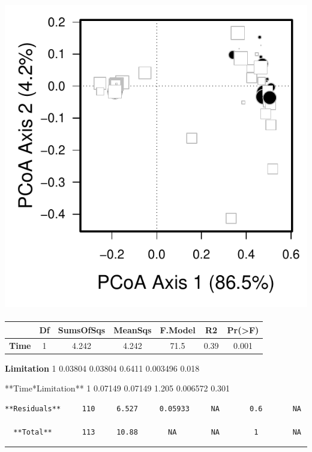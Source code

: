 \documentclass[]{article}
\begin{document}
\subsection{\texorpdfstring{\protect\includegraphics{analysis_ecoevostoich_files/figure-latex/unnamed-chunk-32-1.pdf}}{}}\label{section}

\begin{longtable}[]{@{}ccccccc@{}}
\toprule
~ & Df & SumsOfSqs & MeanSqs & F.Model & R2 &
Pr(\textgreater{}F)\tabularnewline
\midrule
\endhead
\textbf{Time} & 1 & 4.242 & 4.242 & 71.5 & 0.39 & 0.001\tabularnewline
\bottomrule
\end{longtable}

\textbf{Limitation} 1 0.03804 0.03804 0.6411 0.003496 0.018

**Time*Limitation** 1 0.07149 0.07149 1.205 0.006572 0.301

\begin{verbatim}
**Residuals**     110     6.527     0.05933     NA       0.6       NA   

  **Total**       113     10.88       NA        NA        1        NA   
\end{verbatim}

\begin{center}\rule{0.5\linewidth}{\linethickness}\end{center}
\end{document}
